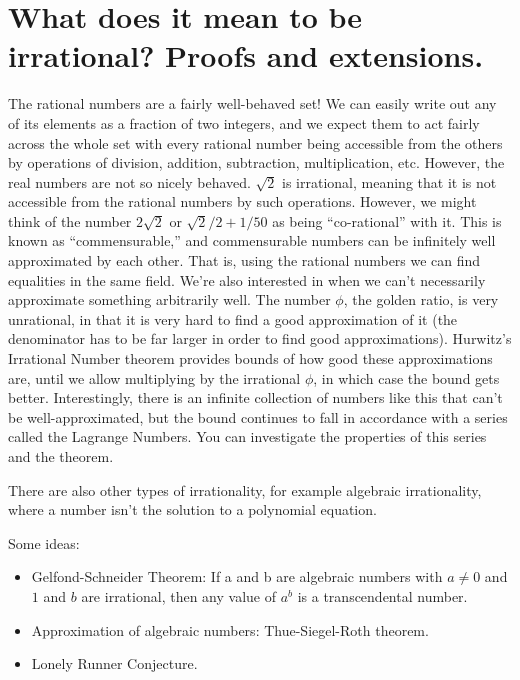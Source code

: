 \documentclass{article}
\begin{document}
\pagebreak

\section{What does it mean to be irrational? Proofs and extensions.}

        The rational numbers are a fairly well-behaved set!
        We can easily write out any of its elements as a fraction of two integers, and we expect them to act fairly across the whole set with every rational number being accessible from the others by operations of division, addition, subtraction, multiplication, etc.
        However, the real numbers are not so nicely behaved. $\sqrt 2$ is irrational, meaning that it is not accessible from the rational numbers by such operations.
        However, we might think of the number $2\sqrt2$ or $\sqrt2/2+1/50$ as being ``co-rational'' with it.
        This is known as ``commensurable,'' and commensurable numbers can be infinitely well approximated by each other. That is, using the rational numbers we can find equalities in the same field. We're also interested in when we can't necessarily approximate something arbitrarily well. The number $\phi$, the golden ratio, is very unrational, in that it is very hard to find a good approximation of it (the denominator has to be far larger in order to find good approximations). Hurwitz's Irrational Number theorem provides bounds of how good these approximations are, until we allow multiplying by the irrational $\phi$, in which case the bound gets better. Interestingly, there is an infinite collection of numbers like this that can't be well-approximated, but the bound continues to fall in accordance with a series called the Lagrange Numbers. You can investigate the properties of this series and the theorem.

        There are also other types of irrationality, for example algebraic irrationality, where a number isn't the solution to a polynomial equation.

        Some ideas:

        \begin{itemize}
            \item Gelfond-Schneider Theorem: If a and b are algebraic numbers with $a \neq 0$ and $1$ and $b$ are irrational, then any value of $a^b$ is a transcendental number.
            \item Approximation of algebraic numbers: Thue-Siegel-Roth theorem.
            \item Lonely Runner Conjecture.
        \end{itemize}
\end{document}
